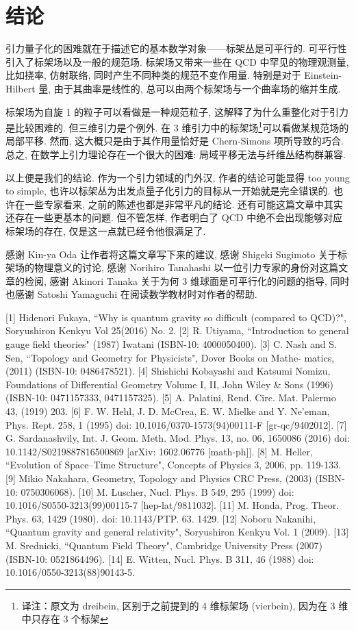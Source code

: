 \documentclass{article}
\begin{document}
\section{结论}
引力量子化的困难就在于描述它的基本数学对象——标架丛是可平行的. 可平行性引入了标架场以及一般的规范场. 标架场又带来一些在 QCD 中罕见的物理观测量, 比如挠率, 仿射联络, 同时产生不同种类的规范不变作用量. 特别是对于 Einstein-Hilbert 量, 由于其曲率是线性的, 总可以由两个标架场与一个曲率场的缩并生成.

标架场为自旋 1 的粒子可以看做是一种规范粒子, 这解释了为什么重整化对于引力是比较困难的. 但三维引力是个例外. 在 3 维引力中的标架场\footnote{译注：原文为 dreibein, 区别于之前提到的 4 维标架场 (vierbein), 因为在 3 维中只存在 3 个标架}可以看做某规范场的局部平移. 然而, 这大概只是由于其作用量恰好是 Chern-Simons 项所导致的巧合. 总之, 在数学上引力理论存在一个很大的困难: 局域平移无法与纤维丛结构群兼容.

以上便是我们的结论. 作为一个引力领域的门外汉, 作者的结论可能显得 too young to simple, 也许以标架丛为出发点量子化引力的目标从一开始就是完全错误的. 也许在一些专家看来, 之前的陈述也都是非常平凡的结论. 还有可能这篇文章中其实还存在一些更基本的问题. 但不管怎样, 作者明白了 QCD 中绝不会出现能够对应标架场的存在, 仅是这一点就已经令他很满足了.

感谢 Kin-ya Oda 让作者将这篇文章写下来的建议, 感谢 Shigeki Sugimoto 关于标架场的物理意义的讨论, 感谢 Norihiro Tanahashi 以一位引力专家的身份对这篇文章的检阅, 感谢 Akinori Tanaka 关于为何 3 维球面是可平行化的问题的指导, 同时也感谢 Satoshi Yamaguchi 在阅读数学教材时对作者的帮助.

[1] Hidenori Fukaya, ``Why is quantum gravity so difficult (compared to QCD)?", Soryushiron Kenkyu Vol 25(2016) No. 2.
[2] R. Utiyama, ``Introduction to general gauge field theories" (1987) Iwatani (ISBN-10:
4000050400).
[3] C. Nash and S. Sen, ``Topology and Geometry for Physicists", Dover Books on Mathe-
matics, (2011) (ISBN-10: 0486478521).
[4] Shishichi Kobayashi and Katsumi Nomizu, Foundations of Differential Geometry Volume I, II, John Wiley & Sons (1996) (ISBN-10: 0471157333, 0471157325).
[5] A. Palatini, Rend. Circ. Mat. Palermo 43, (1919) 203.
[6] F. W. Hehl, J. D. McCrea, E. W. Mielke and Y. Ne'eman, Phys. Rept. 258, 1 (1995) doi: 10.1016/0370-1573(94)00111-F [gr-qc/9402012].
[7] G. Sardanashvily, Int. J. Geom. Meth. Mod. Phys. 13, no. 06, 1650086 (2016) doi: 10.1142/S0219887816500869 [arXiv: 1602.06776 [math-ph]].
[8] M. Heller, ``Evolution of Space--Time Structure", Concepts of Physics 3, 2006, pp. 119-133.
[9] Mikio Nakahara, Geometry, Topology and Physics CRC Press, (2003) (ISBN-10: 0750306068).
[10] M. Luscher, Nucl. Phys. B 549, 295 (1999) doi: 10.1016/S0550-3213(99)00115-7 [hep-lat/9811032].
[11] M. Honda, Prog. Theor. Phys. 63, 1429 (1980). doi: 10.1143/PTP. 63. 1429.
[12] Noboru Nakanihi, ``Quantum gravity and general relativity", Soryushiron Kenkyu Vol. 1 (2009).
[13] M. Srednicki, ``Quantum Field Theory", Cambridge University Press (2007) (ISBN-10: 0521864496).
[14] E. Witten, Nucl. Phys. B 311, 46 (1988) doi: 10.1016/0550-3213(88)90143-5.
\end{document}
